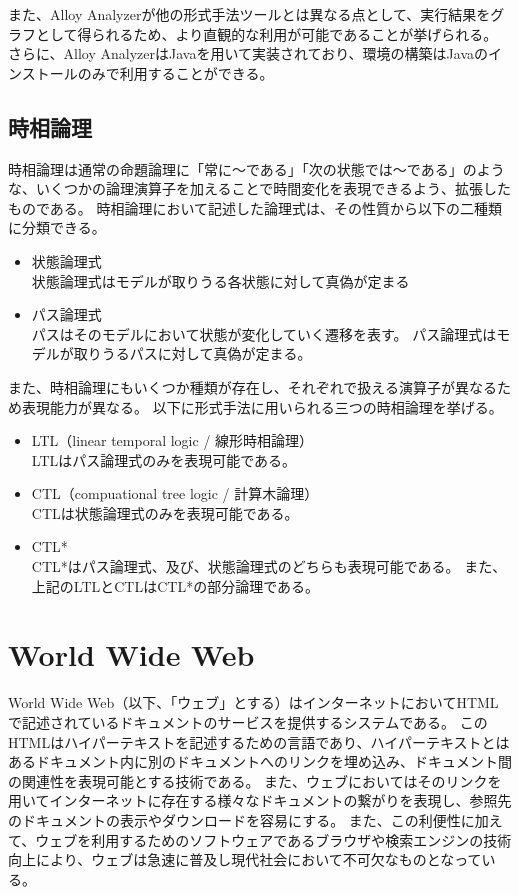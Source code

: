 \documentclass[12pt,a4paper]{jbook}
\begin{document}
また、Alloy Analyzerが他の形式手法ツールとは異なる点として、実行結果をグラフとして得られるため、より直観的な利用が可能であることが挙げられる。
さらに、Alloy AnalyzerはJavaを用いて実装されており、環境の構築はJavaのインストールのみで利用することができる。

\subsection{時相論理}
\label{sec:TemporalLogic}
時相論理は通常の命題論理に「常に～である」「次の状態では～である」のような、いくつかの論理演算子を加えることで時間変化を表現できるよう、拡張したものである。
時相論理において記述した論理式は、その性質から以下の二種類に分類できる。
\begin{itemize}
\item 状態論理式\\
状態論理式はモデルが取りうる各状態に対して真偽が定まる
\item パス論理式\\
パスはそのモデルにおいて状態が変化していく遷移を表す。
パス論理式はモデルが取りうるパスに対して真偽が定まる。
\end{itemize}

また、時相論理にもいくつか種類が存在し、それぞれで扱える演算子が異なるため表現能力が異なる。
以下に形式手法に用いられる三つの時相論理を挙げる。
\begin{itemize}
\item LTL（linear temporal logic / 線形時相論理）\\
LTLはパス論理式のみを表現可能である。
\item CTL（compuational tree logic / 計算木論理）\\
CTLは状態論理式のみを表現可能である。
\item CTL*\\
CTL*はパス論理式、及び、状態論理式のどちらも表現可能である。
また、上記のLTLとCTLはCTL*の部分論理である。
\end{itemize}

\section{World Wide Web}
World Wide Web（以下、「ウェブ」とする）はインターネットにおいてHTMLで記述されているドキュメントのサービスを提供するシステムである。
このHTMLはハイパーテキストを記述するための言語であり、ハイパーテキストとはあるドキュメント内に別のドキュメントへのリンクを埋め込み、ドキュメント間の関連性を表現可能とする技術である。
また、ウェブにおいてはそのリンクを用いてインターネットに存在する様々なドキュメントの繋がりを表現し、参照先のドキュメントの表示やダウンロードを容易にする。
また、この利便性に加えて、ウェブを利用するためのソフトウェアであるブラウザや検索エンジンの技術向上により、ウェブは急速に普及し現代社会において不可欠なものとなっている。
\end{document}
